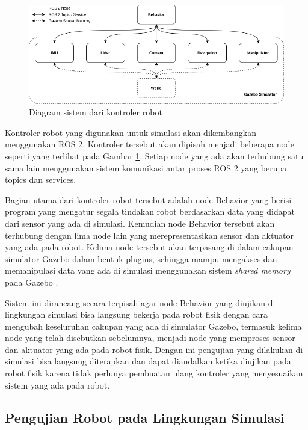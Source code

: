 \begin{figure} [ht] \centering
	\includegraphics[scale=0.45]{gambar/robot-controller.png}
	\caption{Diagram sistem dari kontroler robot}
	\label{fig:RobotController}
\end{figure}

Kontroler robot yang digunakan untuk simulasi akan dikembangkan menggunakan ROS 2.
Kontroler tersebut akan dipisah menjadi beberapa node seperti yang terlihat pada Gambar \ref{fig:RobotController}.
Setiap node yang ada akan terhubung satu sama lain menggunakan sistem komunikasi antar proses ROS 2 yang berupa topics dan services.

Bagian utama dari kontroler robot tersebut adalah node Behavior yang berisi program yang mengatur segala tindakan robot berdasarkan data yang didapat dari sensor yang ada di simulasi.
Kemudian node Behavior tersebut akan terhubung dengan lima node lain yang merepresentasikan sensor dan aktuator yang ada pada robot.
Kelima node tersebut akan terpasang di dalam cakupan simulator Gazebo dalam bentuk plugins, sehingga mampu mengakses dan memanipulasi data yang ada di simulasi menggunakan sistem \emph{shared memory} pada Gazebo \citep{GazeboPlugins}.

Sistem ini dirancang secara terpisah agar node Behavior yang diujikan di lingkungan simulasi bisa langsung bekerja pada robot fisik dengan cara mengubah keseluruhan cakupan yang ada di simulator Gazebo, termasuk kelima node yang telah disebutkan sebelumnya, menjadi node yang memproses sensor dan aktuator yang ada pada robot fisik.
Dengan ini pengujian yang dilakukan di simulasi bisa langsung diterapkan dan dapat diandalkan ketika diujikan pada robot fisik karena tidak perlunya pembuatan ulang kontroler yang menyesuaikan sistem yang ada pada robot.


\subsection{Pengujian Robot pada Lingkungan Simulasi}

